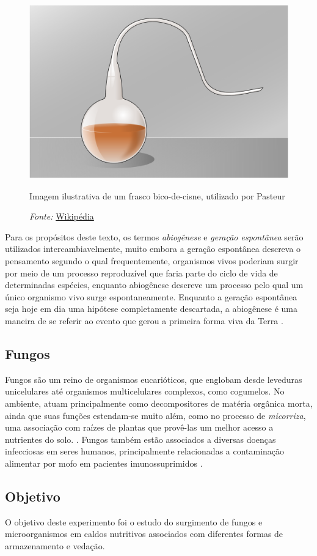 \documentclass[12pt, titlepage]{article}
\begin{document}
\begin{figure}[H]
	\centering
	\includegraphics[width=.4\linewidth]{img/1280px-Coldecygne.svg.png}
	\caption{Imagem ilustrativa de um frasco bico-de-cisne, utilizado por Pasteur}
	\caption*{\textit{Fonte:} \href{https://en.wikipedia.org/wiki/Swan_neck_flask}{Wikipédia}}
	\label{bico-de-cisne}
\end{figure}

Para os propósitos deste texto, os termos \textit{abiogênese} e \textit{geração espontânea} serão utilizados intercambiavelmente, muito embora a geração espontânea descreva o pensamento segundo o qual frequentemente, organismos vivos poderiam surgir por meio de um processo reproduzível que faria parte do ciclo de vida de determinadas espécies, enquanto abiogênese descreve um processo pelo qual um único organismo vivo surge espontaneamente. Enquanto a geração espontânea seja hoje em dia uma hipótese completamente descartada, a abiogênese é uma maneira de se referir ao evento que gerou a primeira forma viva da Terra \cite{vlaardingerbroek2010abiogenesis}.

\subsection{Fungos}
Fungos são um reino de organismos eucarióticos, que englobam desde leveduras unicelulares até organismos multicelulares complexos, como cogumelos. No ambiente, atuam principalmente como decompositores de matéria orgânica morta, ainda que suas funções estendam-se muito além, como no processo de \textit{micorriza}, uma associação com raízes de plantas que provê-las um melhor acesso a nutrientes do solo. \cite{buckley2020fungal}. Fungos também estão associados a diversas doenças infecciosas em seres humanos, principalmente relacionadas a contaminação alimentar por mofo em pacientes imunossuprimidos \cite{Benedict2016}.

\subsection{Objetivo}
O objetivo deste experimento foi o estudo do surgimento de fungos e microorganismos em caldos nutritivos associados com diferentes formas de armazenamento e vedação.
\end{document}

